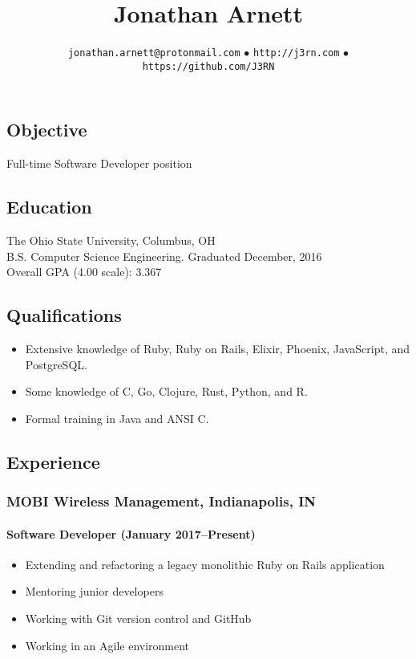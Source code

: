 \documentclass[]{article}
\begin{document}
\title{Jonathan Arnett}
\author{\texttt{jonathan.arnett@protonmail.com} $\bullet$ \texttt{http://j3rn.com} $\bullet$ \texttt{https://github.com/J3RN}}
\date{}
\maketitle

\subsection*{Objective}
Full-time Software Developer position

\subsection*{Education}
The Ohio State University, Columbus, OH \\
B.S. Computer Science Engineering. Graduated December, 2016 \\
Overall GPA (4.00 scale): 3.367

\subsection*{Qualifications}
\begin{itemize}
\item Extensive knowledge of Ruby, Ruby on Rails, Elixir, Phoenix, JavaScript, and PostgreSQL.
\item Some knowledge of C, Go, Clojure, Rust, Python, and R.
\item Formal training in Java and ANSI C.
\end{itemize}

\subsection*{Experience}

\subsubsection*{MOBI Wireless Management, Indianapolis, IN}
\paragraph*{Software Developer (January 2017--Present)}
\begin{itemize}
\item Extending and refactoring a legacy monolithic Ruby on Rails application
\item Mentoring junior developers
\item Working with Git version control and GitHub
\item Working in an Agile environment
\end{itemize}
\end{document}
